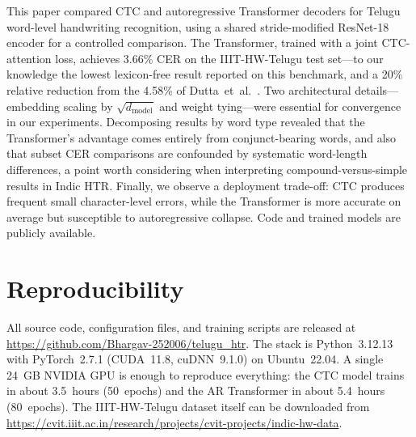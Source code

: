 \documentclass[conference]{IEEEtran}
\begin{document}
This paper compared CTC and autoregressive Transformer decoders for Telugu word-level handwriting recognition, using a shared stride-modified ResNet-18 encoder for a controlled comparison. The Transformer, trained with a joint CTC-attention loss, achieves 3.66\% CER on the IIIT-HW-Telugu test set---to our knowledge the lowest lexicon-free result reported on this benchmark, and a 20\% relative reduction from the 4.58\% of Dutta~et~al.~\cite{dutta2018}. Two architectural details---embedding scaling by $\sqrt{d_{\text{model}}}$ and weight tying---were essential for convergence in our experiments. Decomposing results by word type revealed that the Transformer's advantage comes entirely from conjunct-bearing words, and also that subset CER comparisons are confounded by systematic word-length differences, a point worth considering when interpreting compound-versus-simple results in Indic HTR. Finally, we observe a deployment trade-off: CTC produces frequent small character-level errors, while the Transformer is more accurate on average but susceptible to autoregressive collapse. Code and trained models are publicly available.

\section*{Reproducibility}

All source code, configuration files, and training scripts are released at \url{https://github.com/Bhargav-252006/telugu_htr}. The stack is Python~3.12.13 with PyTorch~2.7.1 (CUDA~11.8, cuDNN~9.1.0) on Ubuntu~22.04. A single 24~GB NVIDIA GPU is enough to reproduce everything: the CTC model trains in about 3.5~hours (50~epochs) and the AR Transformer in about 5.4~hours (80~epochs). The IIIT-HW-Telugu dataset itself can be downloaded from \url{https://cvit.iiit.ac.in/research/projects/cvit-projects/indic-hw-data}.


\end{document}
